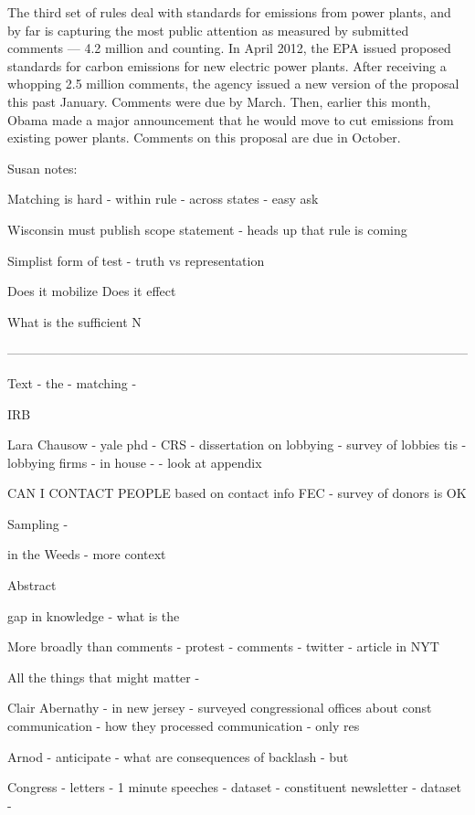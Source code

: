 The third set of rules deal with standards for emissions from power plants, and by far is capturing the most public attention as measured by submitted comments — 4.2 million and counting. In April 2012, the EPA issued proposed standards for carbon emissions for new electric power plants. After receiving a whopping 2.5 million comments, the agency issued a new version of the proposal this past January. Comments were due by March. Then, earlier this month, Obama made a major announcement that he would move to cut emissions from existing power plants. Comments on this proposal are due in October.



Susan notes: 

Matching is hard
- within rule
- across states - easy ask

Wisconsin must publish scope statement 
- heads up that rule is coming


Simplist form of test
- truth vs representation 

Does it mobilize 
Does it effect 

What is the sufficient N 

------------------------------------------------------------------------------------------------------------

Text - the 
- matching 
- 

IRB 





Lara Chausow 
- yale phd - CRS 
- dissertation on lobbying - survey of lobbies tis 
- lobbying firms - in house - 
- look at appendix 

CAN I CONTACT PEOPLE based on contact info 
FEC - survey of donors is OK

Sampling 
- 

in the Weeds 
- more context 

Abstract

gap in knowledge
- what is the 

More broadly than comments
- protest 
- comments
- twitter 
- article in NYT 

All the things that might matter 
- 


Clair Abernathy 
- in new jersey 
- surveyed congressional offices about const communication 
- how they processed communication 
- only res 

Arnod - anticipate 
- what are consequences of backlash 
 - but 

Congress 
- letters 
- 1 minute speeches - dataset
- constituent newsletter -  dataset 
- 


